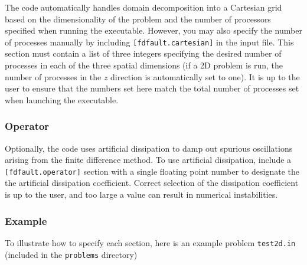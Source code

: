 \documentclass[12pt]{article}   	%
\begin{document}
The code automatically handles domain decomposition into a Cartesian grid based on the dimensionality of the problem and the number of processors specified when running the executable. However, you may also specify the number of processes manually by including {\tt [fdfault.cartesian]} in the input file. This section must contain a list of three integers specifying the desired number of processes in each of the three spatial dimensions (if a 2D problem is run, the number of processes in the $z$ direction is automatically set to one). It is up to the user to ensure that the numbers set here match the total number of processes set when launching the executable.

\subsubsection{Operator}

Optionally, the code uses artificial dissipation to damp out spurious oscillations arising from the finite difference method. To use artificial dissipation, include a {\tt [fdfault.operator]} section with a single floating point number to designate the the artificial dissipation coefficient. Correct selection of the dissipation coefficient is up to the user, and too large a value can result in numerical instabilities.

\subsubsection{Example}

To illustrate how to specify each section, here is an example problem {\tt test2d.in} (included in the {\tt problems} directory)
\end{document}
